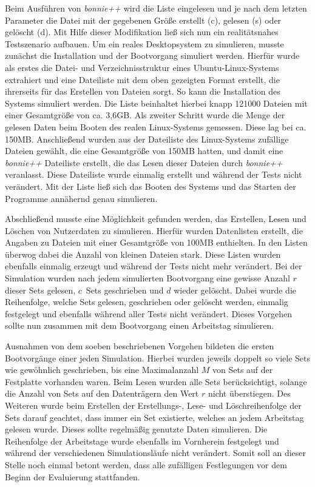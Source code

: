 Beim Ausführen von  \textit{\mbox{bonnie++}} wird die Liste eingelesen und je nach dem letzten Parameter die Datei mit der gegebenen Größe erstellt (c), gelesen (s)
oder gelöscht (d). Mit Hilfe dieser Modifikation ließ sich nun ein realitätsnahes Testszenario aufbauen. Um ein reales Desktopsystem zu simulieren, musste
zunächst die Installation und der Bootvorgang simuliert werden. Hierfür wurde als erstes die Datei- und Verzeichnisstruktur eines Ubuntu-Linux-Systems extrahiert
und eine Dateiliste mit dem oben gezeigten Format erstellt, die ihrerseits für das Erstellen von Dateien sorgt. So kann die Installation des Systems simuliert
werden. Die Liste beinhaltet hierbei knapp 121000 Dateien mit einer Gesamtgröße von ca. 3,6GB. Als zweiter Schritt wurde die Menge der gelesen Daten beim Booten
des realen Linux-Systems gemessen. Diese lag bei ca. 150MB. Anschließend wurden aus der Dateiliste des Linux-Systems zufällige Dateien gewählt, die eine
Gesamtgröße von 150MB hatten, und damit eine \textit{\mbox{bonnie++}} Dateiliste erstellt, die das Lesen dieser Dateien durch \textit{\mbox{bonnie++}} veranlasst. Diese
Dateiliste wurde einmalig erstellt und während der Tests nicht verändert. Mit der Liste ließ sich das Booten des Systems und das Starten der Programme annähernd
genau simulieren.

Abschließend musste eine Möglichkeit gefunden werden, das Erstellen, Lesen und Löschen von Nutzerdaten zu simulieren. Hierfür wurden Datenlisten erstellt, die
Angaben zu Dateien mit einer Gesamtgröße von 100MB enthielten. In den Listen überwog dabei die Anzahl von kleinen Dateien stark. Diese Listen wurden
ebenfalls einmalig erzeugt und während der Tests nicht mehr verändert. Bei der Simulation wurden nach jedem simulierten Bootvorgang eine gewisse Anzahl $r$
dieser Sets gelesen, $c\,$ Sets geschrieben und $d$ wieder gelöscht. Dabei wurde die Reihenfolge, welche Sets gelesen, geschrieben oder gelöscht werden,
einmalig festgelegt und ebenfalls während aller Tests nicht verändert. Dieses Vorgehen sollte nun zusammen mit dem Bootvorgang einen Arbeitstag simulieren.

Ausnahmen von dem soeben beschriebenen Vorgehen bildeten die ersten Bootvorgänge einer jeden Simulation. Hierbei wurden jeweils doppelt so viele Sets wie
gewöhnlich geschrieben, bis eine Maximalanzahl $M$ von Sets auf der Festplatte vorhanden waren. Beim Lesen wurden alle Sets berücksichtigt, solange die Anzahl
von Sets auf den Datenträgern den Wert $r$ nicht überstiegen. Des Weiteren wurde beim Erstellen der Erstellungs-, Lese- und Löschreihenfolge der Sets darauf
geachtet, dass immer ein Set existierte, welches an jedem Arbeitstag gelesen wurde. Dieses sollte regelmäßig genutzte Daten simulieren. Die Reihenfolge der
Arbeitstage wurde ebenfalls im Vornherein festgelegt und während der verschiedenen Simulationsläufe nicht verändert. Somit soll an dieser Stelle noch einmal
betont werden, dass alle zufälligen Festlegungen vor dem Beginn der Evaluierung stattfanden.

